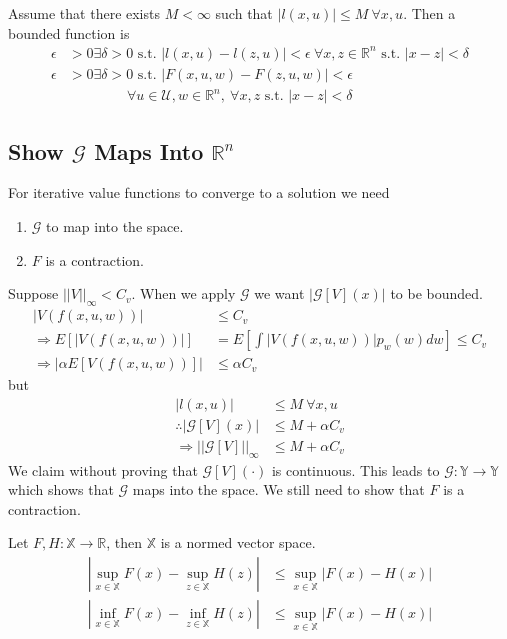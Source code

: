 Assume that there exists $M<\infty$ such that $|l(x,u)|\leq M~\forall x,u$.
Then a bounded function is
\begin{align*}
\epsilon&>0 \exists \delta>0 \text{~s.t.~} |l(x,u)-l(z,u)|<\epsilon~\forall x,z\in\mathbb{R}^n \text{~s.t.~} |x-z|<\delta \\
\epsilon&>0 \exists \delta>0 \text{~s.t.~} |F(x,u,w)-F(z,u,w)|<\epsilon \\
&\qquad\qquad~\forall u\in\mathcal{U},w\in\mathbb{R}^n,~\forall x,z \text{~s.t.~} |x-z|<\delta
\end{align*}

\subsection{Show $\mathcal{G}$ Maps Into $\mathbb{R}^n$}
For iterative value functions to converge to a solution we need
\begin{enumerate}
\item $\mathcal{G}$ to map into the space.
\item $F$ is a contraction.
\end{enumerate}
Suppose $||V||_\infty<C_v$.
When we apply $\mathcal{G}$ we want $|\mathcal{G}[V](x)|$ to be bounded.
\begin{align*}
|V(f(x,u,w))| &\leq C_v \\
\Rightarrow E[|V(f(x,u,w))|] &= E[\int|V(f(x,u,w))|p_w(w)dw] \leq C_v \\
\Rightarrow |\alpha E[V(f(x,u,w))]| &\leq \alpha C_v
\end{align*}
but
\begin{align*}
|l(x,u)| &\leq M~\forall x,u \\
\therefore |\mathcal{G}[V](x)| &\leq M + \alpha C_v \\
\Rightarrow ||\mathcal{G}[V]||_\infty &\leq M + \alpha C_v
\end{align*}
We claim without proving that $\mathcal{G}[V](\cdot)$ is continuous.
This leads to $\mathcal{G}:\mathbb{Y}\to\mathbb{Y}$ which shows that $\mathcal{G}$ maps into the space.
We still need to show that $F$ is a contraction.

\begin{theorem}%
\label{th:nvs}
Let $F,H:\mathbb{X}\to\mathbb{R}$, then $\mathbb{X}$ is a normed vector space.
\begin{align*}
|\sup_{x\in\mathbb{X}}F(x) - \sup_{z\in\mathbb{X}}H(z)| &\leq \sup_{x\in\mathbb{X}}|F(x)-H(x)| \\
|\inf_{x\in\mathbb{X}}F(x) - \inf_{z\in\mathbb{X}}H(z)| &\leq \sup_{x\in\mathbb{X}}|F(x)-H(x)|
\end{align*}
\end{theorem}

